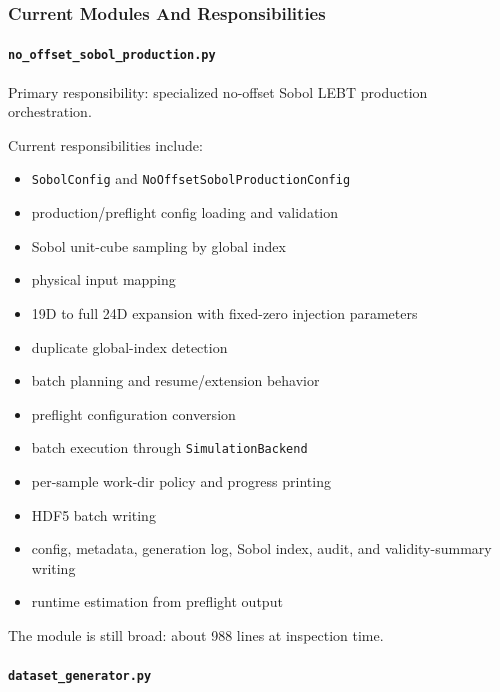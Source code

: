 \documentclass[
]{article}
\providecommand{\tightlist}{%
  \setlength{\itemsep}{0pt}\setlength{\parskip}{0pt}}
\begin{document}
\hypertarget{current-modules-and-responsibilities}{%
\subsubsection{Current Modules And
Responsibilities}\label{current-modules-and-responsibilities}}

\hypertarget{no_offset_sobol_production.py}{%
\paragraph{\texorpdfstring{\texttt{no\_offset\_sobol\_production.py}}{no\_offset\_sobol\_production.py}}\label{no_offset_sobol_production.py}}

Primary responsibility: specialized no-offset Sobol LEBT production
orchestration.

Current responsibilities include:

\begin{itemize}
\tightlist
\item
  \texttt{SobolConfig} and \texttt{NoOffsetSobolProductionConfig}
\item
  production/preflight config loading and validation
\item
  Sobol unit-cube sampling by global index
\item
  physical input mapping
\item
  19D to full 24D expansion with fixed-zero injection parameters
\item
  duplicate global-index detection
\item
  batch planning and resume/extension behavior
\item
  preflight configuration conversion
\item
  batch execution through \texttt{SimulationBackend}
\item
  per-sample work-dir policy and progress printing
\item
  HDF5 batch writing
\item
  config, metadata, generation log, Sobol index, audit, and
  validity-summary writing
\item
  runtime estimation from preflight output
\end{itemize}

The module is still broad: about 988 lines at inspection time.

\hypertarget{dataset_generator.py}{%
\paragraph{\texorpdfstring{\texttt{dataset\_generator.py}}{dataset\_generator.py}}\label{dataset_generator.py}}
\end{document}
